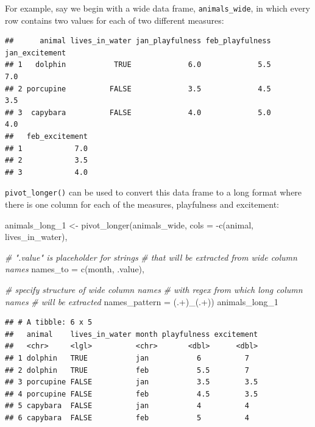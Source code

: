 \documentclass[
]{book}
\newenvironment{Shaded}{\begin{snugshade}}{\end{snugshade}}
\newcommand{\AttributeTok}[1]{\textcolor[rgb]{0.77,0.63,0.00}{#1}}
\newcommand{\CommentTok}[1]{\textcolor[rgb]{0.56,0.35,0.01}{\textit{#1}}}
\newcommand{\FunctionTok}[1]{\textcolor[rgb]{0.00,0.00,0.00}{#1}}
\newcommand{\NormalTok}[1]{#1}
\newcommand{\OtherTok}[1]{\textcolor[rgb]{0.56,0.35,0.01}{#1}}
\newcommand{\SpecialCharTok}[1]{\textcolor[rgb]{0.00,0.00,0.00}{#1}}
\newcommand{\StringTok}[1]{\textcolor[rgb]{0.31,0.60,0.02}{#1}}
\begin{document}
For example, say we begin with a wide data frame, \texttt{animals\_wide}, in which every row contains two values for each of two different measures:

\begin{verbatim}
##      animal lives_in_water jan_playfulness feb_playfulness jan_excitement
## 1   dolphin           TRUE             6.0             5.5            7.0
## 2 porcupine          FALSE             3.5             4.5            3.5
## 3  capybara          FALSE             4.0             5.0            4.0
##   feb_excitement
## 1            7.0
## 2            3.5
## 3            4.0
\end{verbatim}

\texttt{pivot\_longer()} can be used to convert this data frame to a long format where there is one column for each of the measures, playfulness and excitement:

\begin{Shaded}
\begin{Highlighting}[]
\NormalTok{animals\_long\_1 }\OtherTok{\textless{}{-}} \FunctionTok{pivot\_longer}\NormalTok{(animals\_wide,}
                             \AttributeTok{cols =} \SpecialCharTok{{-}}\FunctionTok{c}\NormalTok{(}\StringTok{\textquotesingle{}animal\textquotesingle{}}\NormalTok{, }\StringTok{\textquotesingle{}lives\_in\_water\textquotesingle{}}\NormalTok{),}
                             
                             \CommentTok{\# ".value" is placeholder for strings }
                             \CommentTok{\# that will be extracted from wide column names }
                             \AttributeTok{names\_to =} \FunctionTok{c}\NormalTok{(}\StringTok{\textquotesingle{}month\textquotesingle{}}\NormalTok{, }\StringTok{\textquotesingle{}.value\textquotesingle{}}\NormalTok{),}
                             
                             \CommentTok{\# specify structure of wide column names }
                             \CommentTok{\# with regex from which long column names }
                             \CommentTok{\# will be extracted}
                             \AttributeTok{names\_pattern =} \StringTok{\textquotesingle{}(.+)\_(.+)\textquotesingle{}}\NormalTok{) }
\NormalTok{animals\_long\_1}
\end{Highlighting}
\end{Shaded}

\begin{verbatim}
## # A tibble: 6 x 5
##   animal    lives_in_water month playfulness excitement
##   <chr>     <lgl>          <chr>       <dbl>      <dbl>
## 1 dolphin   TRUE           jan           6          7  
## 2 dolphin   TRUE           feb           5.5        7  
## 3 porcupine FALSE          jan           3.5        3.5
## 4 porcupine FALSE          feb           4.5        3.5
## 5 capybara  FALSE          jan           4          4  
## 6 capybara  FALSE          feb           5          4
\end{verbatim}
\end{document}
